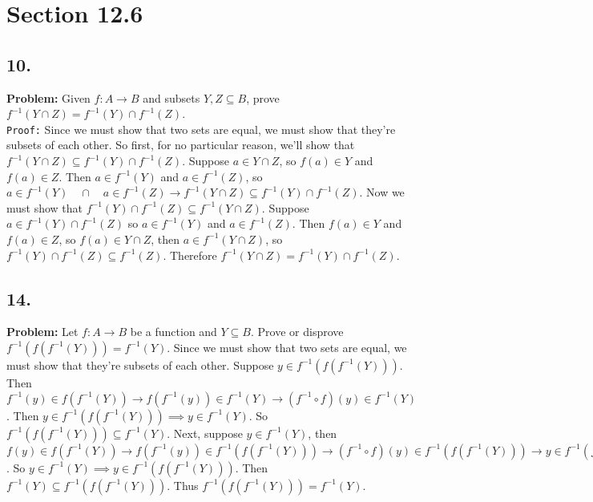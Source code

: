 \documentclass[12pt]{article}
\begin{document}
\begin{minipage}[t]{0.40\textwidth}
	
\section*{Section 12.6}
\subsection*{10.}
\textbf{Problem:} Given $ f:A\rightarrow B $ and subsets $ Y,Z\subseteq B $, prove $ f^{-1}(Y\cap Z)=f^{-1}(Y)\cap f^{-1}(Z) $.
\\\texttt{Proof:} Since we must show that two sets are equal, we must show that they're subsets of each other. So first, for no particular reason, we'll show that $ f^{-1}(Y\cap Z)\subseteq f^{-1}(Y)\cap f^{-1}(Z) $. Suppose $ a\in Y\cap Z $, so $ f(a)\in Y $ and $ f(a)\in Z $. Then $ a\in f^{-1}(Y) $ and $ a\in f^{-1}(Z) $, so $ a\in f^{-1}(Y)\quad\cap\quad a\in f^{-1}(Z) \rightarrow f^{-1}(Y\cap Z)\subseteq f^{-1}(Y)\cap f^{-1}(Z) $. Now we must show that $ f^{-1}(Y)\cap f^{-1}(Z)\subseteq f^{-1}(Y\cap Z) $. Suppose $ a\in f^{-1}(Y)\cap f^{-1}(Z) $ so $a\in f^{-1}(Y) $ and $ a\in f^{-1}(Z) $. Then $ f(a)\in Y $ and $ f(a)\in Z $, so $ f(a)\in Y\cap Z $, then $ a\in f^{-1}(Y\cap Z) $, so $ f^{-1}(Y)\cap f^{-1}(Z)\subseteq f^{-1}(Z)$. Therefore $ f^{-1}(Y\cap Z)=f^{-1}(Y)\cap f^{-1}(Z) $.  
\end{minipage}
\hfill\vline\hfill
\begin{minipage}[t]{0.45\textwidth}
	

\subsection*{14.}
\textbf{Problem:} Let $ f:A\rightarrow B $ be a function and $ Y\subseteq B $. Prove or disprove $ f^{-1}(f(f^{-1}(Y))) =f^{-1}(Y) $. Since we must show that two sets are equal, we must show that they're subsets of each other. Suppose $ y\in f^{-1}(f(f^{-1}(Y))) $. Then $ f^{-1}(y)\in f(f^{-1}(Y))\rightarrow f(f^{-1}(y))\in f^{-1}(Y) \rightarrow (f^{-1}\circ f)(y)\in f^{-1}(Y)$. Then $ y\in f^{-1}(f(f^{-1}(Y)))\implies y\in f^{-1}(Y) $. So $ f^{-1}(f(f^{-1}(Y)))\subseteq f^{-1}(Y) $. Next, suppose $ y\in f^{-1}(Y) $, then $ f(y)\in f(f^{-1}(Y))\rightarrow f(f^{-1}(y))\in f^{-1}(f(f^{-1}(Y))) \rightarrow (f^{-1}\circ f)(y)\in f^{-1}(f(f^{-1}(Y)))\rightarrow y\in f^{-1}(f(f^{-1}(Y)))$. So $y\in f^{-1}(Y) \implies y\in f^{-1}(f(f^{-1}(Y))) $. Then $ f^{-1}(Y)\subseteq f^{-1}(f(f^{-1}(Y))) $. Thus $ f^{-1}(f(f^{-1}(Y))) =f^{-1}(Y) $.     
	
	

\end{minipage}




\end{document}
